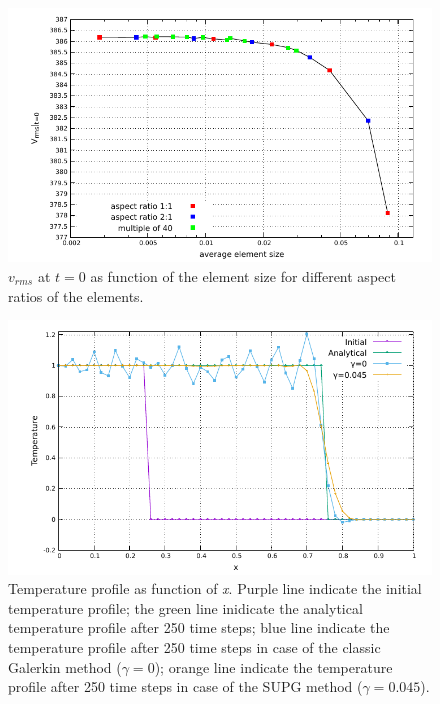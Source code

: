 \documentclass[draft,tec]{agutexSI2019}
\begin{document}
\begin{figure}
\noindent\includegraphics[width=\textwidth]{./Figures/Thin_Layer_Initial.pdf}
\caption{$v_{rms}$ at $t=0$ as function of the element size for different aspect ratios of the elements.}
\label{fig:thin_initial}
\end{figure}

\begin{figure}
\noindent\includegraphics[width=\textwidth]{./Figures/Advection.pdf}
\caption{Temperature profile as function of \textit{x}. Purple line indicate the initial temperature profile; the green line inidicate the analytical temperature profile after 250 time steps; blue line indicate the temperature profile after 250 time steps in case of the classic Galerkin method ($\gamma=0$); orange line indicate the temperature profile after 250 time steps in case of the SUPG method ($\gamma=0.045$).}
\label{fig:advection}
\end{figure}
\end{document}
